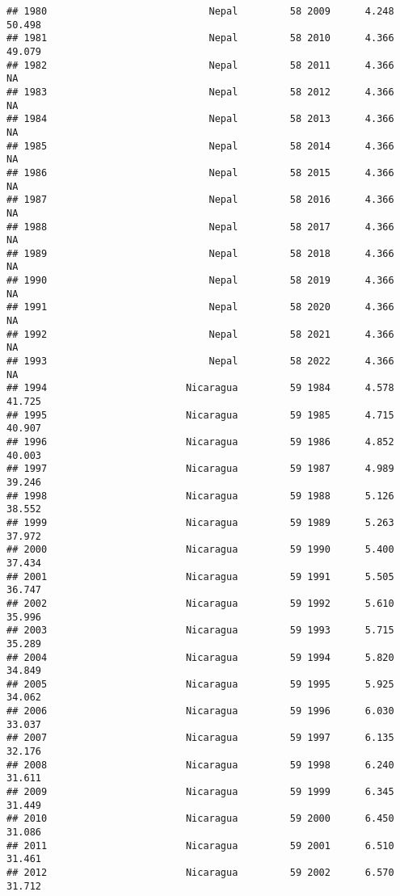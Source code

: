 \documentclass[
]{article}
\begin{document}
\begin{verbatim}
## 1980                            Nepal         58 2009      4.248     50.498
## 1981                            Nepal         58 2010      4.366     49.079
## 1982                            Nepal         58 2011      4.366         NA
## 1983                            Nepal         58 2012      4.366         NA
## 1984                            Nepal         58 2013      4.366         NA
## 1985                            Nepal         58 2014      4.366         NA
## 1986                            Nepal         58 2015      4.366         NA
## 1987                            Nepal         58 2016      4.366         NA
## 1988                            Nepal         58 2017      4.366         NA
## 1989                            Nepal         58 2018      4.366         NA
## 1990                            Nepal         58 2019      4.366         NA
## 1991                            Nepal         58 2020      4.366         NA
## 1992                            Nepal         58 2021      4.366         NA
## 1993                            Nepal         58 2022      4.366         NA
## 1994                        Nicaragua         59 1984      4.578     41.725
## 1995                        Nicaragua         59 1985      4.715     40.907
## 1996                        Nicaragua         59 1986      4.852     40.003
## 1997                        Nicaragua         59 1987      4.989     39.246
## 1998                        Nicaragua         59 1988      5.126     38.552
## 1999                        Nicaragua         59 1989      5.263     37.972
## 2000                        Nicaragua         59 1990      5.400     37.434
## 2001                        Nicaragua         59 1991      5.505     36.747
## 2002                        Nicaragua         59 1992      5.610     35.996
## 2003                        Nicaragua         59 1993      5.715     35.289
## 2004                        Nicaragua         59 1994      5.820     34.849
## 2005                        Nicaragua         59 1995      5.925     34.062
## 2006                        Nicaragua         59 1996      6.030     33.037
## 2007                        Nicaragua         59 1997      6.135     32.176
## 2008                        Nicaragua         59 1998      6.240     31.611
## 2009                        Nicaragua         59 1999      6.345     31.449
## 2010                        Nicaragua         59 2000      6.450     31.086
## 2011                        Nicaragua         59 2001      6.510     31.461
## 2012                        Nicaragua         59 2002      6.570     31.712

\end{verbatim}
\end{document}
